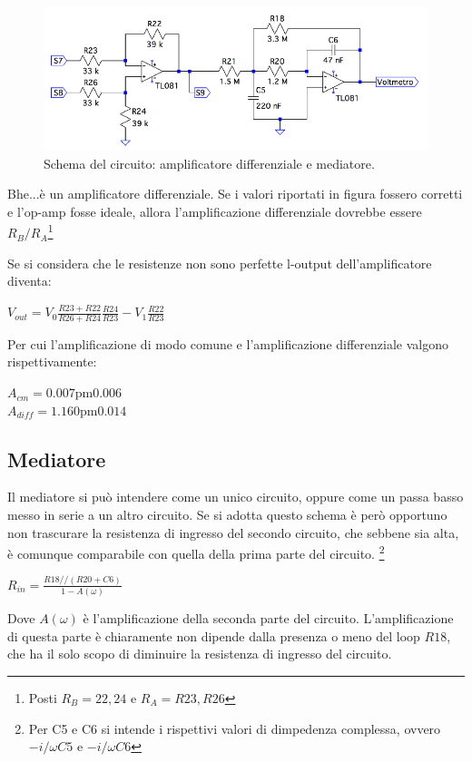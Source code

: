 \documentclass[a4paper,10pt]{article}
\begin{document}
\begin{figure}[H]
	\centering
	\includegraphics[width=\textwidth]{../grafici/DiffAmpAv.png}
	\caption{Schema del circuito: amplificatore differenziale e mediatore.}
	\label{fig:diffav}
\end{figure}

Bhe...è un amplificatore differenziale. Se i valori riportati in figura fossero corretti e l'op-amp fosse ideale, allora l'amplificazione differenziale dovrebbe essere $R_B/R_A$\footnote{Posti $R_B=22, 24$ e $R_A=R23, R26$}

Se si considera che le resistenze non sono perfette l-output dell'amplificatore diventa:

$V_{out}=V_0\frac{R23+R22}{R26+R24}\frac{R24}{R23}-V_1\frac{R22}{R23}$

Per cui l'amplificazione di modo comune e l'amplificazione differenziale valgono rispettivamente:

$A_{cm}=\unit{0.007\pm 0.006}{}$ \\
$A_{diff}=\unit{1.160 \pm 0.014}{}$ 

\subsection{Mediatore}

Il mediatore si può intendere come un unico circuito, oppure come un passa basso messo in serie a un altro circuito. Se si adotta questo schema è però opportuno non trascurare la resistenza di ingresso del secondo circuito, che sebbene sia alta, è comunque comparabile con quella della prima parte del circuito. \footnote{Per C5 e C6 si intende i rispettivi valori di dimpedenza complessa, ovvero $-i/\omega C5$ e $-i/\omega C6$}


$R_{in}=\frac{R18//(R20+C6)}{1-A(\omega)}$

Dove $A(\omega)$ è l'amplificazione della seconda parte del circuito.
L'amplificazione di questa parte è chiaramente non dipende dalla presenza o meno del loop $R18$, che ha il solo scopo di diminuire la resistenza di ingresso del circuito.
\end{document}
